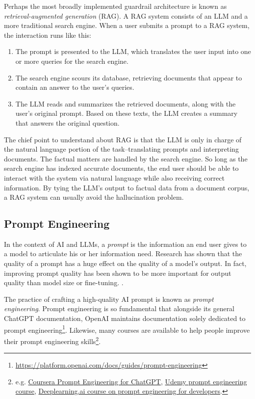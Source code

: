 \documentclass[12pt, oneside]{article}   	%
\begin{document}
Perhaps the most broadly implemented guardrail architecture is known as \emph{retrieval-augmented generation} (RAG).  A RAG system consists of an LLM and a more traditional search engine.  When a user submits a prompt to a RAG system, the interaction runs like this:
\begin{enumerate}
\item The prompt is presented to the LLM, which translates the user input into one or more queries for the search engine.
\item The search engine scours its database, retrieving documents that appear to contain an answer to the user's queries.
\item The LLM reads and summarizes the retrieved documents, along with the user's original prompt.  Based on these texts, the LLM creates a summary that answers the original question.
\end{enumerate}
The chief point to understand about RAG is that the LLM is only in charge of the natural language portion of the task--translating prompts and interpreting documents.  The factual matters are handled by the search engine.  So long as the search engine has indexed accurate documents, the end user should be able to interact with the system via natural language while also receiving correct information.  By tying the LLM's output to factual data from a document corpus, a RAG system can usually avoid the hallucination problem.




\subsection{Prompt Engineering}\label{section.vocab.prompt-engineering}
In the context of AI and LLMs, a \emph{prompt} is the information an end user gives to a model to articulate his or her information need.  Research has shown that the quality of a prompt has a huge effect on the quality of a model's output.  In fact, improving prompt quality has been shown to be more important for output quality than model size or fine-tuning. \cite{white:2023}.  

The practice of crafting a high-quality AI prompt is known as \emph{prompt engineering}.  Prompt engineering is so fundamental that alongside its general ChatGPT documentation, OpenAI maintains documentation solely dedicated to prompt engineering\footnote{\url{https://platform.openai.com/docs/guides/prompt-engineering}}.  Likewise, many courses are available to help people improve their prompt engineering skills\footnote{e.g. \href{https://www.coursera.org/learn/prompt-engineering}{Coursera Prompt Engineering for ChatGPT}, \href{https://www.udemy.com/course/prompt-engineering-for-ai}{Udemy prompt engineering course}, \href{https://www.deeplearning.ai/short-courses/chatgpt-prompt-engineering-for-developers/}{Deeplearning.ai course on prompt engineering for developers}. }.
\end{document}
